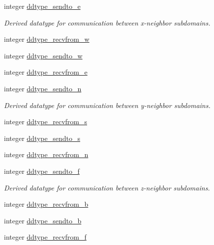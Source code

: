 \textbf{ }\par
\begin{DoxyCompactItemize}
\item 
integer \hyperlink{namespacempi__subdomain_a93395266b1630e5a91e8e89531dfcec6}{ddtype\+\_\+sendto\+\_\+e}
\begin{DoxyCompactList}\small\item\em Derived datatype for communication between x-\/neighbor subdomains. \end{DoxyCompactList}\item 
integer \hyperlink{namespacempi__subdomain_a0b2a4ab6d6a88a3817f473a5c2c172b9}{ddtype\+\_\+recvfrom\+\_\+w}
\item 
integer \hyperlink{namespacempi__subdomain_a0701fde01daea1a6fd51b62c75b8ee82}{ddtype\+\_\+sendto\+\_\+w}
\item 
integer \hyperlink{namespacempi__subdomain_a18a84c0f3ca27cd4dd73057ff035f341}{ddtype\+\_\+recvfrom\+\_\+e}
\end{DoxyCompactItemize}

\textbf{ }\par
\begin{DoxyCompactItemize}
\item 
integer \hyperlink{namespacempi__subdomain_a55f5c1af9bd941fd176e619bddbb8d82}{ddtype\+\_\+sendto\+\_\+n}
\begin{DoxyCompactList}\small\item\em Derived datatype for communication between y-\/neighbor subdomains. \end{DoxyCompactList}\item 
integer \hyperlink{namespacempi__subdomain_a1f46916f08758533cad3ecac33233e38}{ddtype\+\_\+recvfrom\+\_\+s}
\item 
integer \hyperlink{namespacempi__subdomain_a660f83d621188fb7eb60ad10eab4c9b5}{ddtype\+\_\+sendto\+\_\+s}
\item 
integer \hyperlink{namespacempi__subdomain_a74f1edb3c9227692b250285680518dc4}{ddtype\+\_\+recvfrom\+\_\+n}
\end{DoxyCompactItemize}

\textbf{ }\par
\begin{DoxyCompactItemize}
\item 
integer \hyperlink{namespacempi__subdomain_a4f3d66535b947c7afee75e6e73a47206}{ddtype\+\_\+sendto\+\_\+f}
\begin{DoxyCompactList}\small\item\em Derived datatype for communication between z-\/neighbor subdomains. \end{DoxyCompactList}\item 
integer \hyperlink{namespacempi__subdomain_ad6462f18c8c68c076005957e9d062252}{ddtype\+\_\+recvfrom\+\_\+b}
\item 
integer \hyperlink{namespacempi__subdomain_a7a2af0322a7aaa435951a5432859687a}{ddtype\+\_\+sendto\+\_\+b}
\item 
integer \hyperlink{namespacempi__subdomain_a4da19838e8bc3934ad5c24db424bec2c}{ddtype\+\_\+recvfrom\+\_\+f}
\end{DoxyCompactItemize}



